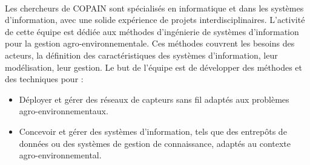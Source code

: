 \paragraph{}
Les chercheurs de COPAIN sont spécialisés en informatique et dans les systèmes d'information, avec une solide expérience de projets interdisciplinaires. L'activité de cette équipe est dédiée aux méthodes d'ingénierie de systèmes d'information pour la gestion agro-environnementale. Ces méthodes couvrent les besoins des acteurs, la définition des caractéristiques des systèmes d'information, leur modélisation, leur gestion. 
\newline
Le but de l'équipe est de développer des méthodes et des techniques pour : 
\begin{itemize}
    \item Déployer et gérer des réseaux de capteurs sans fil adaptés aux problèmes agro-environnementaux. 
    \item Concevoir et gérer des systèmes d'information, tels que des entrepôts de données ou des systèmes de gestion de connaissance, adaptés au contexte agro-environnemental. 
\end{itemize}